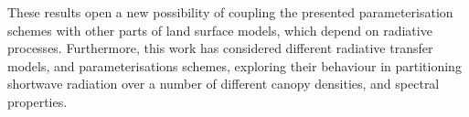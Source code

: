 These results open a new possibility of coupling the presented parameterisation schemes with other parts of land surface models, which depend on radiative processes. Furthermore, this work has considered different radiative transfer models, and parameterisations schemes, exploring their behaviour in partitioning shortwave radiation over a number of different canopy densities, and spectral properties. 




%

%

